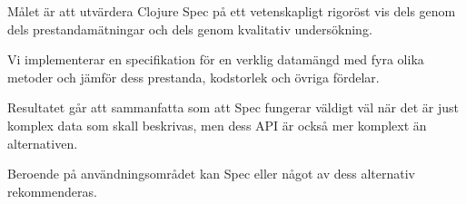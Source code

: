 Målet är att utvärdera Clojure Spec på ett vetenskapligt rigoröst vis
dels genom dels prestandamätningar och dels genom kvalitativ
undersökning.

Vi implementerar en specifikation för en verklig datamängd med fyra
olika metoder och jämför dess prestanda, kodstorlek och övriga fördelar.

Resultatet går att sammanfatta som att Spec fungerar väldigt väl när det
är just komplex data som skall beskrivas, men dess API är också mer
komplext än alternativen.

Beroende på användningsområdet kan Spec eller något av dess alternativ
rekommenderas.

